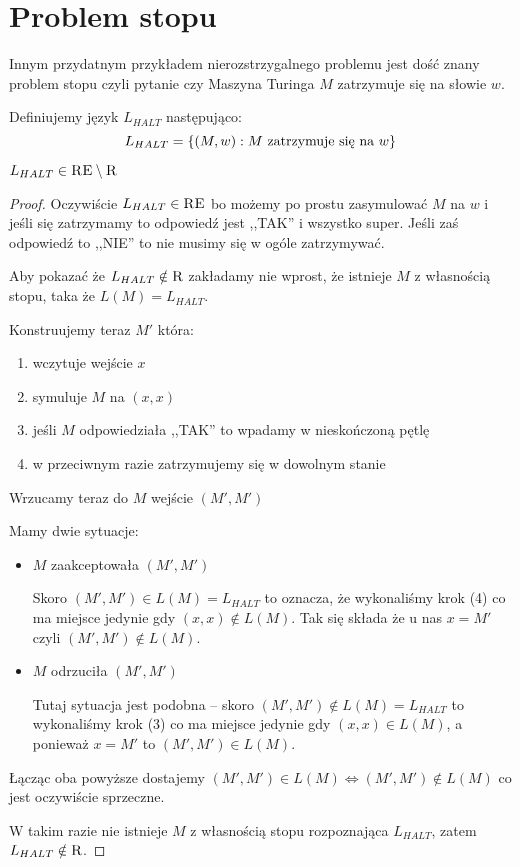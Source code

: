\section{Problem stopu}

Innym przydatnym przykładem nierozstrzygalnego problemu jest dość znany problem stopu czyli pytanie czy Maszyna Turinga \( M \) zatrzymuje się na słowie \( w \).

\begin{definition}
	Definiujemy język \( L_{HALT} \) następująco:
	\[
		L_{HALT} = \set{(M, w) : M \text{ zatrzymuje się na } w}
	\]
\end{definition}

\begin{theorem}
	\( L_{HALT} \in \textsc{RE} \setminus \textsc{R} \)
\end{theorem}
\begin{proof}
	Oczywiście \( L_{HALT} \in \textsc{RE} \) bo możemy po prostu zasymulować \( M \) na \( w \) i jeśli się zatrzymamy to odpowiedź jest ,,TAK'' i wszystko super. Jeśli zaś odpowiedź to ,,NIE'' to nie musimy się w ogóle zatrzymywać.

	Aby pokazać że \( L_{HALT} \notin \textsc{R} \) zakładamy nie wprost, że istnieje \( M \) z własnością stopu, taka że \( L(M) = L_{HALT} \).

	Konstruujemy teraz \( M' \) która:
	\begin{enumerate}
		\item wczytuje wejście \( x \)
		\item symuluje \( M \) na \( (x, x) \)
		\item jeśli \( M \) odpowiedziała ,,TAK'' to wpadamy w nieskończoną pętlę
		\item w przeciwnym razie zatrzymujemy się w dowolnym stanie
	\end{enumerate}

	Wrzucamy teraz do \( M \) wejście \( (M', M') \)

	Mamy dwie sytuacje:
	\begin{itemize}
		\item \( M \) zaakceptowała \( (M', M') \)

		      Skoro \( (M', M') \in L(M) = L_{HALT} \) to oznacza, że
		      wykonaliśmy krok (4) co ma miejsce jedynie gdy \( (x, x) \notin L(M) \). Tak się składa że u nas \( x = M' \) czyli \( (M', M') \notin L(M) \).

		\item \( M \) odrzuciła \( (M', M') \)

		      Tutaj sytuacja jest podobna -- skoro \( (M', M') \notin L(M) = L_{HALT} \) to
		      wykonaliśmy krok (3) co ma miejsce jedynie gdy \( (x, x) \in L(M) \), a ponieważ \( x = M' \) to \( (M', M') \in L(M) \).
	\end{itemize}

	Łącząc oba powyższe dostajemy \( (M', M') \in L(M) \iff (M', M') \notin L(M) \) co jest oczywiście sprzeczne.

	W takim razie nie istnieje \( M \) z własnością stopu rozpoznająca \( L_{HALT} \), zatem \( L_{HALT} \notin \textsc{R} \).
\end{proof}